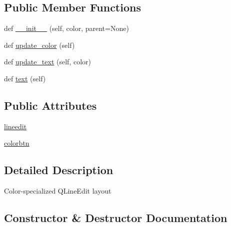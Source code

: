 \subsection*{Public Member Functions}
\begin{DoxyCompactItemize}
\item 
def \hyperlink{classmatplotlib_1_1backends_1_1qt__editor_1_1__formlayout_1_1ColorLayout_a64a2f271612300d50239ef03b9efec7d}{\+\_\+\+\_\+init\+\_\+\+\_\+} (self, color, parent=None)
\item 
def \hyperlink{classmatplotlib_1_1backends_1_1qt__editor_1_1__formlayout_1_1ColorLayout_a6386aa288136ade04b8a17a1712ee9da}{update\+\_\+color} (self)
\item 
def \hyperlink{classmatplotlib_1_1backends_1_1qt__editor_1_1__formlayout_1_1ColorLayout_ad09a9051db9b6c9df52a38d57ab1087b}{update\+\_\+text} (self, color)
\item 
def \hyperlink{classmatplotlib_1_1backends_1_1qt__editor_1_1__formlayout_1_1ColorLayout_aebbe860f3a6134ff4968a449dfbaddf0}{text} (self)
\end{DoxyCompactItemize}
\subsection*{Public Attributes}
\begin{DoxyCompactItemize}
\item 
\hyperlink{classmatplotlib_1_1backends_1_1qt__editor_1_1__formlayout_1_1ColorLayout_aaffb5a95e1bc2a7fe6db9d3d44b418bf}{lineedit}
\item 
\hyperlink{classmatplotlib_1_1backends_1_1qt__editor_1_1__formlayout_1_1ColorLayout_a3dbe0091a9a7bfeaa0e41e4b43ef8473}{colorbtn}
\end{DoxyCompactItemize}


\subsection{Detailed Description}
\begin{DoxyVerb}Color-specialized QLineEdit layout\end{DoxyVerb}
 

\subsection{Constructor \& Destructor Documentation}
\mbox{\label{classmatplotlib_1_1backends_1_1qt__editor_1_1__formlayout_1_1ColorLayout_a64a2f271612300d50239ef03b9efec7d}} 

